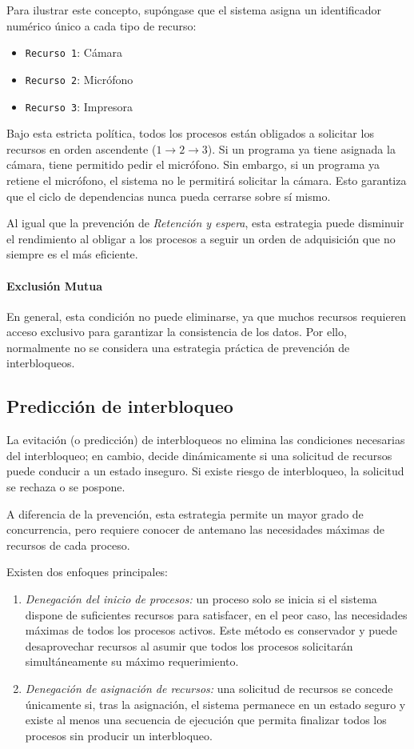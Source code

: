 Para ilustrar este concepto, supóngase que el sistema asigna un identificador numérico único a cada tipo de recurso:
\begin{itemize}
  \item \texttt{Recurso 1}: Cámara
  \item \texttt{Recurso 2}: Micrófono
  \item \texttt{Recurso 3}: Impresora
\end{itemize}

Bajo esta estricta política, todos los procesos están obligados a solicitar los recursos en orden ascendente (\(1 \rightarrow 2 \rightarrow 3\)). Si un programa ya tiene asignada la cámara, tiene permitido pedir el micrófono. Sin embargo, si un programa ya retiene el micrófono, el sistema no le permitirá solicitar la cámara. Esto garantiza que el ciclo de dependencias nunca pueda cerrarse sobre sí mismo.

Al igual que la prevención de \textit{Retención y espera}, esta estrategia puede disminuir el rendimiento al obligar a los procesos a seguir un orden de adquisición que no siempre es el más eficiente.

\paragraph{Exclusión Mutua}
En general, esta condición no puede eliminarse, ya que muchos recursos requieren acceso exclusivo para garantizar la consistencia de los datos. Por ello, normalmente no se considera una estrategia práctica de prevención de interbloqueos.

\subsection{Predicción de interbloqueo}

La evitación (o predicción) de interbloqueos no elimina las condiciones necesarias del interbloqueo; en cambio, decide dinámicamente si una solicitud de recursos puede conducir a un estado inseguro. Si existe riesgo de interbloqueo, la solicitud se rechaza o se pospone.

A diferencia de la prevención, esta estrategia permite un mayor grado de concurrencia, pero requiere conocer de antemano las necesidades máximas de recursos de cada proceso.

Existen dos enfoques principales:
\begin{enumerate}
  \item \textit{Denegación del inicio de procesos:} un proceso solo se inicia si el sistema dispone de suficientes recursos para satisfacer, en el peor caso, las necesidades máximas de todos los procesos activos. Este método es conservador y puede desaprovechar recursos al asumir que todos los procesos solicitarán simultáneamente su máximo requerimiento.

  \item \textit{Denegación de asignación de recursos:} una solicitud de recursos se concede únicamente si, tras la asignación, el sistema permanece en un estado seguro y existe al menos una secuencia de ejecución que permita finalizar todos los procesos sin producir un interbloqueo.
\end{enumerate}

